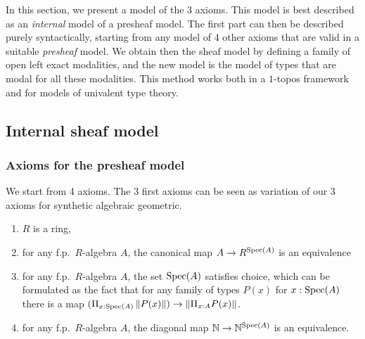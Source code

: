 \newcommand{\inc}{\mathsf{inc}}
\newcommand{\inl}{\mathsf{inl}}
\newcommand{\inr}{\mathsf{inr}}
\newcommand{\idd}{\mathsf{id}}
\newcommand{\II}{\mathbf{I}}
\newcommand{\nats}{\mathbb{N}}
\newcommand\norm[1]{\left\lVert #1 \right\rVert}


\newcommand{\Gm}{\mathsf{G_m}}
\newcommand{\ext}{\mathsf{ext}}
\newcommand{\patch}{\mathsf{patch}}
\newcommand{\cov}{\mathsf{cov}}
\newcommand{\isSheaf}{\mathsf{isSheaf}}
\newcommand{\isIso}{\mathsf{isIso}}
\newcommand{\Fib}{\mathsf{Fib}}

\newcommand{\Typp}{\mathsf{Type}}
\newcommand{\Elem}{\mathsf{Elem}}
\newcommand{\Cont}{\mathsf{Cont}}

\newcommand{\BB}{\square}
\newcommand{\CC}{\mathcal{C}}
\newcommand{\UU}{\mathcal{U}}
\newcommand{\WW}{\mathcal{W}}
\newcommand{\VV}{\mathcal{V}}

In this section, we present a model of the 3 axioms. This model is best described as an \emph{internal} model
of a presheaf model. The first part can then be described purely syntactically, starting from any model
of 4 other axioms that are valid in a suitable \emph{presheaf} model. We obtain then the sheaf model by defining
a family of open left exact modalities, and the new model is the model of types that are modal for all these modalities.
This method works both in a $1$-topos framework and for models of univalent type theory.

\subsection{Internal sheaf model}

\subsubsection{Axioms for the presheaf model}

We start from 4 axioms. The 3 first axioms can be seen as variation of our 3 axioms for synthetic algebraic geometric.

\begin{enumerate}[(1)]
\item $R$ is a ring,
\item for any f.p.\ $R$-algebra $A$, the canonical map $A\rightarrow R^{\operatorname{Spec}(A)}$ is an equivalence
\item for any f.p.\ $R$-algebra $A$, the set $\operatorname{Spec}(A)$ satisfies choice, which can be formulated as
  the fact that for any family of types $P(x)$ for $x:\operatorname{Spec}(A)$ there is a map
  $(\Pi_{x:\Spec(A)}\norm{P(x)})\rightarrow \norm{\Pi_{x:A}P(x)}$.
\item for any f.p.\ $R$-algebra $A$, the diagonal map $\nats\rightarrow\nats^{\Spec(A)}$ is an equivalence.
\end{enumerate}

